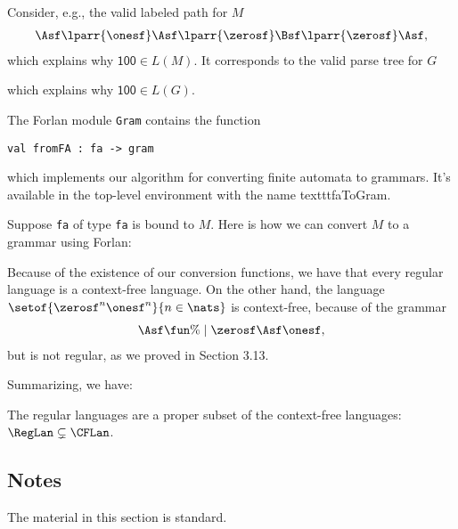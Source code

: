 Consider, e.g., the valid labeled path for $M$
\begin{gather*}
\Asf\lparr{\onesf}\Asf\lparr{\zerosf}\Bsf\lparr{\zerosf}\Asf ,
\end{gather*}
which explains why $\mathsf{100}\in L(M)$.  It corresponds to the
valid parse tree for $G$
\begin{center}

\end{center}
which explains why $\mathsf{100}\in L(G)$.

The Forlan module \texttt{Gram} contains the function
\begin{verbatim}
val fromFA : fa -> gram
\end{verbatim}
which implements our algorithm for converting finite automata to
grammars.  It's available in the top-level environment with the name
texttt{faToGram}.

Suppose \texttt{fa} of type \texttt{fa} is bound to $M$.  Here is how
we can convert $M$ to a grammar using Forlan:


Because of the existence of our conversion functions, we have that
every regular language is a context-free language.
On the other hand, the language $\setof{\zerosf^n\onesf^n}{n\in\nats}$
is context-free, because of the grammar
\begin{gather*}
  \Asf\fun\%\mid\zerosf\Asf\onesf ,
\end{gather*}
but is not regular, as we proved in Section 3.13.

Summarizing, we have:

\begin{theorem}
The regular languages are a proper subset of the context-free
languages: $\RegLan\subsetneq\CFLan$.
\end{theorem}

\subsection{Notes}

The material in this section is standard.

